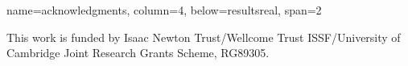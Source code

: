 \documentclass[a0paper,portrait,fontscale=0.35]{baposter}
\theoremstyle{plain}
\theoremstyle{plain}
\theoremstyle{definition}
\theoremstyle{plain}
\theoremstyle{definition}
\begin{document}
\begin{poster}
{name=acknowledgments, column=4, below=resultsreal, span=2}
{  
  \scriptsize
  This work is funded by 
  Isaac Newton Trust/Wellcome Trust ISSF/University of Cambridge 
  Joint Research Grants Scheme, RG89305.

  \par
}






\end{poster}
\end{document}
